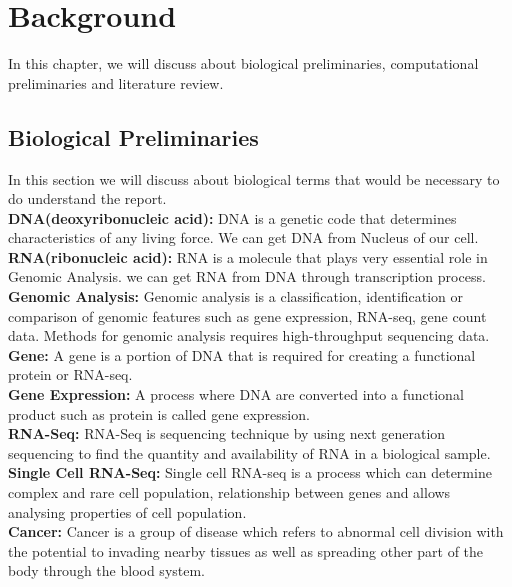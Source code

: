 \chapter{Background}
In this chapter, we will discuss about biological preliminaries, computational preliminaries and literature review.
\section{Biological Preliminaries}
\label{bio_pre}
In this section we will discuss about biological terms that would be necessary to do understand the report. \\[10pt]

\textbf{DNA(deoxyribonucleic acid):} DNA is a genetic code that determines characteristics of any living force. We can get DNA from Nucleus of our cell. \\[5pt] 

\textbf{RNA(ribonucleic acid):} RNA is a molecule that plays very essential role in Genomic Analysis. we can get RNA from DNA through transcription process.\\[5pt]

\textbf{Genomic Analysis:} Genomic analysis is a classification, identification or comparison of genomic features such as gene expression, RNA-seq, gene count data. Methods for genomic analysis requires high-throughput sequencing data.\\[5pt]

\textbf{Gene:} A gene is a portion of DNA that is required for creating a functional protein or RNA-seq.\\[5pt]

\textbf{Gene Expression:} A process where DNA are converted into a functional product such as protein is called gene expression.\\[5pt]

\textbf{RNA-Seq:} RNA-Seq is sequencing technique by using next generation sequencing to find the quantity and availability of RNA in a biological sample.\\[5pt]

\textbf{Single Cell RNA-Seq:} Single cell RNA-seq is a process which can determine complex and rare cell population, relationship between genes and allows analysing properties of cell population.\\[5pt]

\textbf{Cancer:} Cancer is a group of disease which refers to abnormal cell division with the potential to invading nearby tissues as well as spreading other part of the body through the blood system. \\[5pt] 

